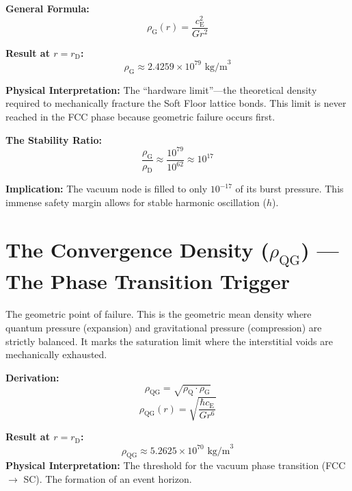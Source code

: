 \noindent\textbf{General Formula:}
\begin{equation}
    \rho_{\mathrm{G}}(r) = \frac{c_{\mathrm{E}}^2}{G r^2}
\end{equation}

\noindent\textbf{Result at $r = r_{\mathrm{D}}$:}
\begin{equation}
    \rho_{\mathrm{G}} \approx 2.4259 \times 10^{79} \text{ kg/m}^3
\end{equation}

\noindent\textbf{Physical Interpretation:} The ``hardware limit''---the theoretical density required to mechanically fracture the Soft Floor lattice bonds. This limit is never reached in the FCC phase because geometric failure occurs first.

\noindent\textbf{The Stability Ratio:}
\begin{equation}
    \frac{\rho_{\mathrm{G}}}{\rho_{\mathrm{D}}} \approx \frac{10^{79}}{10^{62}} \approx 10^{17}
\end{equation}

\noindent\textbf{Implication:} The vacuum node is filled to only $10^{-17}$ of its burst pressure. This immense safety margin allows for stable harmonic oscillation ($h$).

\section{The Convergence Density ($\rho_{\mathrm{QG}}$) --- The Phase Transition Trigger}
The geometric point of failure. This is the geometric mean density where quantum pressure (expansion) and gravitational pressure (compression) are strictly balanced. It marks the saturation limit where the interstitial voids are mechanically exhausted.

\noindent\textbf{Derivation:}
\begin{equation}
    \rho_{\mathrm{QG}} = \sqrt{\rho_{\mathrm{Q}} \cdot \rho_{\mathrm{G}}}
\end{equation}
\begin{equation}
    \rho_{\mathrm{QG}}(r) = \sqrt{\frac{\hbar c_{\mathrm{E}}}{G r^6}}
\end{equation}

\noindent\textbf{Result at $r = r_{\mathrm{D}}$:}
\begin{equation}
    \rho_{\mathrm{QG}} \approx 5.2625 \times 10^{70} \text{ kg/m}^3
\end{equation}
\textbf{Physical Interpretation:} The threshold for the vacuum phase transition (FCC $\to$ SC). The formation of an event horizon.

